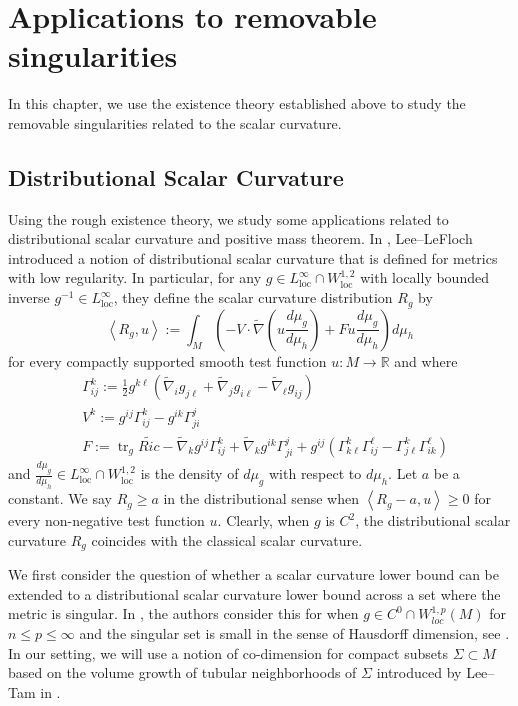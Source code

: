 \documentclass[12pt]{amsart}
\newcommand{\hdel}{\tilde{\nabla}}
\theoremstyle{remark}
\numberwithin{equation}{section}
\def\tr{\operatorname{tr}}
\begin{document}
\section{Applications to removable singularities}\label{sec:applications}

In this chapter, we use the existence theory established above to study the  removable singularities related to the scalar curvature.


\subsection{Distributional Scalar Curvature}

Using the rough existence theory, we study some applications related to distributional scalar curvature and positive mass theorem. In \cite{lee_positive_2015}, Lee--LeFloch introduced a notion of distributional scalar curvature that is defined for metrics with low regularity. In particular, for any $g \in L^\infty_{\text{loc}}\cap W^{1,2}_{\text{loc}}$ with locally bounded inverse $g^{-1}\in L^\infty_{\text{loc}}$, they define the scalar curvature distribution $R_g$ by
\begin{equation}\label{eqn:distributional-scalar-defn}
    \left\langle R_g, u\right\rangle := \int_M \left(-V\cdot\hdel\left(u\frac{d\mu_g}{d\mu_h}\right)+Fu\frac{d\mu_g}{d\mu_h}\right)d\mu_h
\end{equation}
for every compactly supported smooth test function $u:M\to\mathbb{R}$ and where
\begin{align*}
    &\Gamma^k_{ij} := \frac{1}{2}g^{k\ell}\left(\hdel_ig_{j\ell}+\hdel_jg_{i\ell}-\hdel_{\ell}g_{ij}\right) \\
    &V^k := g^{ij}\Gamma^{k}_{ij} - g^{ik}\Gamma^{j}_{ji} \\
    &F := \tr_g\widetilde{Ric} - \hdel_kg^{ij}\Gamma^k_{ij} + \hdel_kg^{ik}\Gamma^{j}_{ji} + g^{ij}\left(\Gamma^{k}_{k\ell}\Gamma^{\ell}_{ij} - \Gamma^{k}_{j\ell}\Gamma^{\ell}_{ik}\right)
\end{align*}
and $\frac{d\mu_g}{d\mu_h}\in L^\infty_{\text{loc}}\cap W^{1,2}_{\text{loc}}$ is the density of $d\mu_g$ with respect to $d\mu_h$. Let $a$ be a constant. We say $R_g \geq a$ in the distributional sense when $\left\langle R_g - a, u\right\rangle \geq 0$ for every non-negative test function $u$. Clearly, when $g$ is $C^2$, the distributional scalar curvature $R_g$ coincides with the classical scalar curvature.

We first consider the question of whether a scalar curvature lower bound can be extended to a distributional scalar curvature lower bound across a set where the metric is singular. In \cite{jiang_removable_2022}, the authors consider this for when $g \in C^0 \cap W^{1,p}_{loc}(M)$ for $n \leq p \leq \infty$ and the singular set is small in the sense of Hausdorff dimension, see  \cite[Lemma 2.7]{jiang_removable_2022}. In our setting, we will use a notion of co-dimension for compact subsets $\Sigma \subset M$ based on the volume growth of tubular neighborhoods of $\Sigma$ introduced by Lee--Tam in \cite{lee_continuous_2021}.
\end{document}
